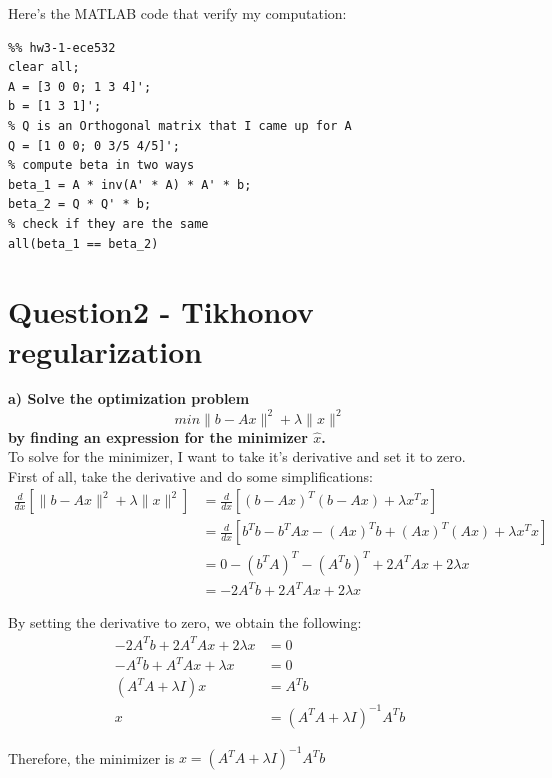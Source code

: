 \documentclass[paper=a4, fontsize=11pt]{scrartcl} %
\numberwithin{equation}{section} %
\numberwithin{figure}{section} %
\numberwithin{table}{section} %
\begin{document}
Here's the MATLAB code that verify my computation:
\begin{lstlisting}
%% hw3-1-ece532
clear all; 
A = [3 0 0; 1 3 4]';
b = [1 3 1]';
% Q is an Orthogonal matrix that I came up for A 
Q = [1 0 0; 0 3/5 4/5]';
% compute beta in two ways
beta_1 = A * inv(A' * A) * A' * b;
beta_2 = Q * Q' * b;
% check if they are the same
all(beta_1 == beta_2)
\end{lstlisting}

\newpage

\section*{Question2 - Tikhonov regularization}


\textbf{a) Solve the optimization problem }
$$
min \|b - Ax\|^{2} + \lambda \|x\|^{2}
$$
\textbf{by finding an expression for the minimizer $\hat{x}$.}\\

To solve for the minimizer, I want to take it's derivative and set it to zero. \\
First of all, take the derivative and do some simplifications: 
\begin{equation*} 
\begin{split}
\frac{d}{dx} [\|b - Ax\|^{2} + \lambda \|x\|^{2} ]
& =  \frac{d}{dx} [(b - Ax)^T(b - Ax) + \lambda x^Tx] \\
& =  \frac{d}{dx} [b^Tb - b^TAx - (Ax)^Tb + (Ax)^T(Ax) + \lambda x^Tx] \\
& =  0 - (b^TA)^T - (A^Tb)^T + 2A^TAx + 2\lambda x \\
& =  -2A^Tb + 2A^TAx + 2\lambda x
\end{split}
\end{equation*}

By setting the derivative to zero, we obtain the following: 
\begin{align*} 
-2A^Tb + 2A^TAx + 2\lambda x &= 0  \\ 
-A^Tb + A^TAx + \lambda x &= 0  	\\ 
(A^TA + \lambda I) x &= A^Tb 		\\
 x &= (A^TA + \lambda I)^{-1} A^Tb 	
\end{align*}


Therefore, the minimizer is $x= (A^TA + \lambda I)^{-1} A^Tb $\\
\end{document}
